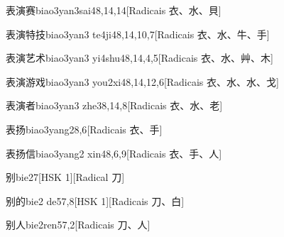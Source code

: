 \begin{entry}{表演赛}{biao3yan3sai4}{8,14,14}[Radicais ⾐、⽔、⾙]
\end{entry}

\begin{entry}{表演特技}{biao3yan3 te4ji4}{8,14,10,7}[Radicais ⾐、⽔、⽜、⼿]
\end{entry}

\begin{entry}{表演艺术}{biao3yan3 yi4shu4}{8,14,4,5}[Radicais ⾐、⽔、⾋、⽊]
\end{entry}

\begin{entry}{表演游戏}{biao3yan3 you2xi4}{8,14,12,6}[Radicais ⾐、⽔、⽔、⼽]
\end{entry}

\begin{entry}{表演者}{biao3yan3 zhe3}{8,14,8}[Radicais ⾐、⽔、⽼]
\end{entry}

\begin{entry}{表扬}{biao3yang2}{8,6}[Radicais ⾐、⼿]
\end{entry}

\begin{entry}{表扬信}{biao3yang2 xin4}{8,6,9}[Radicais ⾐、⼿、⼈]
\end{entry}

\begin{entry}{别}{bie2}{7}[HSK 1][Radical ⼑]
\end{entry}

\begin{entry}{别的}{bie2 de5}{7,8}[HSK 1][Radicais ⼑、⽩]
\end{entry}

\begin{entry}{别人}{bie2ren5}{7,2}[Radicais ⼑、⼈]
\end{entry}

